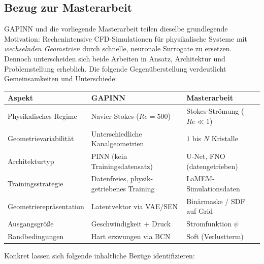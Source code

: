 \documentclass[a4paper,12pt]{article}
\begin{document}
\subsection*{Bezug zur Masterarbeit}

GAPINN und die vorliegende Masterarbeit teilen dieselbe grundlegende Motivation:
Rechenintensive CFD-Simulationen f\"ur physikalische Systeme mit
\emph{wechselnden Geometrien} durch schnelle, neuronale Surrogate zu ersetzen.
Dennoch unterscheiden sich beide Arbeiten in Ansatz, Architektur und
Problemstellung erheblich. Die folgende Gegen\"uberstellung verdeutlicht
Gemeinsamkeiten und Unterschiede:

\begin{center}
\begin{tabular}{lll}
\toprule
\textbf{Aspekt} & \textbf{GAPINN} & \textbf{Masterarbeit} \\
\midrule
Physikalisches Regime & Navier-Stokes ($Re = 500$) & Stokes-Str\"omung ($Re \ll 1$) \\
Geometrievariabilit\"at & Unterschiedliche Kanalgeometrien & $1$ bis $N$ Kristalle \\
Architekturtyp & PINN (kein Trainingsdatensatz) & U-Net, FNO (datengetrieben) \\
Trainingsstrategie & Datenfreies, physik-getriebenes Training & LaMEM-Simulationsdaten \\
Geometrierepr\"asentation & Latentvektor via VAE/SEN & Bin\"armaske / SDF auf Grid \\
Ausgangs\-gr\"o\ss{}e & Geschwindigkeit + Druck & Stromfunktion $\psi$ \\
Randbedingungen & Hart erzwungen via BCN & Soft (Verlustterm) \\
\bottomrule
\end{tabular}
\end{center}

\medskip

Konkret lassen sich folgende inhaltliche Bez\"uge identifizieren:
\end{document}

